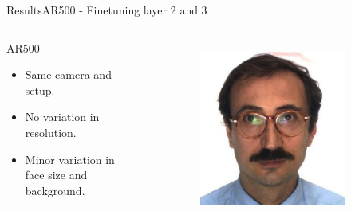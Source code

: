 \begin{frame}{Results}{AR500 - Finetuning layer 2 and 3}
    \begin{columns}
        \begin{block}{AR500}
            \begin{itemize}
                \item Same camera and setup.
                \item No variation in resolution.
                \item Minor variation in face size and background.
            \end{itemize}
        \end{block}
        \begin{figure}
            \centering
            \begin{subfigure}[b]{0.45\textwidth}
                \includegraphics[width=\textwidth]{sections/malte_slides/ar1}
            \end{subfigure}
            \begin{subfigure}[b]{0.45\textwidth}

\end{subfigure}
\end{figure}
\end{columns}
\end{frame}
